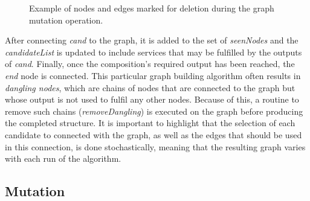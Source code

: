 \documentclass{article}
\begin{document}
\begin{figure}[h]
\centerline{
}
\caption{Example of nodes and edges marked for deletion during the graph mutation operation.}
\label{fig:mutationExample}
\end{figure}

After connecting
\textit{cand} to the graph, it is added to the set of \textit{seenNodes} and the \textit{candidateList} is updated to include services
that may be fulfilled by the outputs of \textit{cand}. Finally, once the composition's required output has been reached, the \textit{end}
node is connected. This particular graph building algorithm often results in \textit{dangling nodes}, which are chains of nodes that are
connected to the graph but whose output is not used to fulfil any other nodes. Because of this, a routine to remove such chains (\textit{removeDangling})
is executed on the graph before producing the completed structure. It is important to highlight that the selection of each candidate
to connected with the graph, as well as the edges that should be used in this connection, is done stochastically, meaning that the
resulting graph varies with each run of the algorithm.

\subsection{Mutation}
\end{document}
